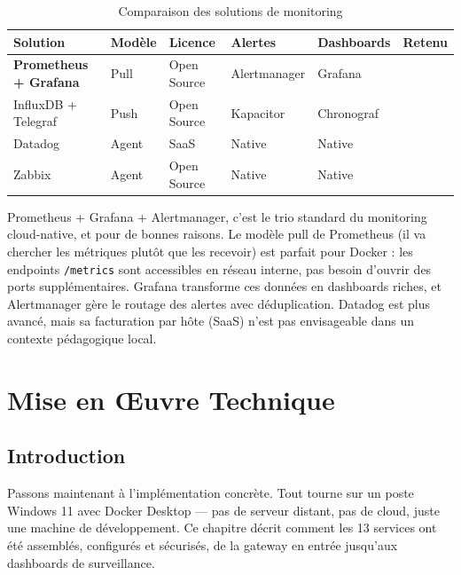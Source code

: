 \documentclass[12pt, a4paper]{report}
\newcommand{\cmark}{\ding{51}}
\newcommand{\xmark}{\ding{55}}
\begin{document}
\begin{table}[H]
  \centering
  \caption{Comparaison des solutions de monitoring}
  \begin{tabularx}{\textwidth}{@{}lXXXXX@{}}
    \toprule
    \textbf{Solution} & \textbf{Modèle} & \textbf{Licence} & \textbf{Alertes} & \textbf{Dashboards} & \textbf{Retenu} \\
    \midrule
    \textbf{Prometheus + Grafana} & Pull & Open Source & Alertmanager & Grafana & \cmark \\
    InfluxDB + Telegraf           & Push & Open Source & Kapacitor    & Chronograf & \xmark \\
    Datadog                       & Agent & SaaS        & Native       & Native & \xmark \\
    Zabbix                        & Agent & Open Source & Native       & Native & \xmark \\
    \bottomrule
  \end{tabularx}
\end{table}

\medskip
Prometheus + Grafana + Alertmanager, c'est le trio standard du monitoring cloud-native, et pour de bonnes raisons. Le modèle pull de Prometheus (il va chercher les métriques plutôt que les recevoir) est parfait pour Docker : les endpoints \texttt{/metrics} sont accessibles en réseau interne, pas besoin d'ouvrir des ports supplémentaires. Grafana transforme ces données en dashboards riches, et Alertmanager gère le routage des alertes avec déduplication. Datadog est plus avancé, mais sa facturation par hôte (SaaS) n'est pas envisageable dans un contexte pédagogique local.

\chapter{Mise en Œuvre Technique}

\section{Introduction}

Passons maintenant à l'implémentation concrète. Tout tourne sur un poste Windows 11 avec Docker Desktop — pas de serveur distant, pas de cloud, juste une machine de développement. Ce chapitre décrit comment les 13 services ont été assemblés, configurés et sécurisés, de la gateway en entrée jusqu'aux dashboards de surveillance.
\end{document}
